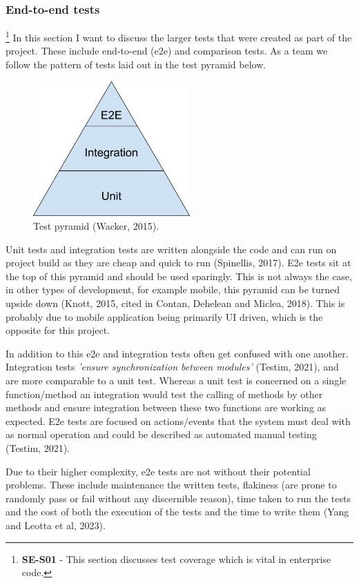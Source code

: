   \newpage
  \subsubsection{End-to-end tests}
  \footnote{\textbf{SE-S01} - This section discusses test coverage which is vital in enterprise code.}
  In this section I want to discuss the larger tests that were created as part of the project. These include end-to-end (e2e) and comparison tests.
  As a team we follow the pattern of tests laid out in the test pyramid below.

  \begin{figure}[H]
    \centering
    \includegraphics[width=6cm]{assets/testPyramid.png}
    \caption{Test pyramid (Wacker, 2015).}
    \label{fig:testPyramid}
  \end{figure}

  Unit tests and integration tests are written alongside the code and can run on project build as they are cheap and quick to run (Spinellis, 2017).
  E2e tests sit at the top of this pyramid and should be used sparingly. This is not always the case, in other types of development, for example mobile,
  this pyramid can be turned upside down (Knott, 2015, cited in Contan, Dehelean and Miclea, 2018). This is probably due to mobile application being 
  primarily UI driven, which is the opposite for this project.

  In addition to this e2e and integration tests often get confused with one another. Integration tests \textit{'ensure synchronization between modules'}
  (Testim, 2021), and are more comparable to a unit test. Whereas a unit test is concerned on a single function/method an integration would test the calling of 
  methods by other methods and ensure integration between these two functions are working as expected. E2e tests are focused on actions/events that the 
  system must deal with as normal operation and could be described as automated manual testing (Testim, 2021).
  
  Due to their higher complexity, e2e tests are not without their potential problems. These include maintenance the written 
  tests, flakiness (are prone to randomly pass or fail without any discernible reason), time taken to run the tests and the cost of both the 
  execution of the tests and the time to write them (Yang and Leotta et al, 2023). 

